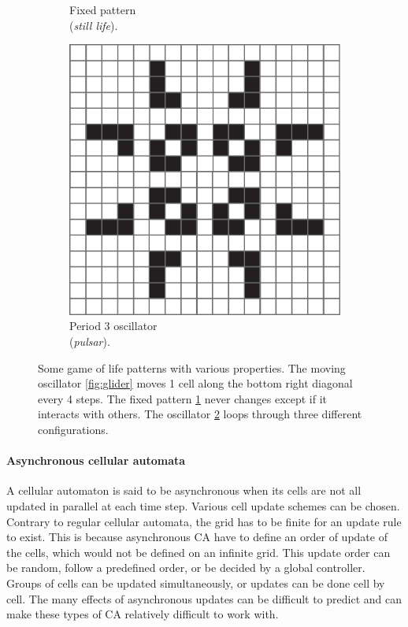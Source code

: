 \begin{figure}[htbp]
\begin{subfigure}[t]{.31\linewidth}
    \caption{Fixed pattern\\ (\emph{still life}).}
    \label{fig:still_life}
  \end{subfigure}
  \begin{subfigure}[t]{.31\linewidth}
    \centering
    \includegraphics[width=\linewidth]{figures/pulsar.pdf}
    \caption{Period 3 oscillator\\ (\emph{pulsar}).}
    \label{fig:pulsar}
  \end{subfigure}

  \caption{Some game of life patterns with various properties. The moving
    oscillator \ref{fig:glider} moves 1 cell along the bottom right diagonal
    every 4 steps. The fixed pattern \ref{fig:still_life} never changes except
    if it interacts with others. The oscillator \ref{fig:pulsar} loops through
    three different configurations.}
  \label{fig:gol_patterns}
\end{figure}


\paragraph{Asynchronous cellular automata}
A cellular automaton is said to be asynchronous when its cells are not all
updated in parallel at each time step. Various cell update schemes can be
chosen. Contrary to regular cellular automata, the grid has to be finite for an
update rule to exist. This is because asynchronous \ac{CA} have to define an
order of update of the cells, which would not be defined on an infinite grid.
This update order can be random, follow a predefined order, or be decided by a
global controller. Groups of cells can be updated simultaneously, or updates can
be done cell by cell. The many effects of asynchronous updates can be difficult
to predict and can make these types of \ac{CA} relatively difficult to work with.

